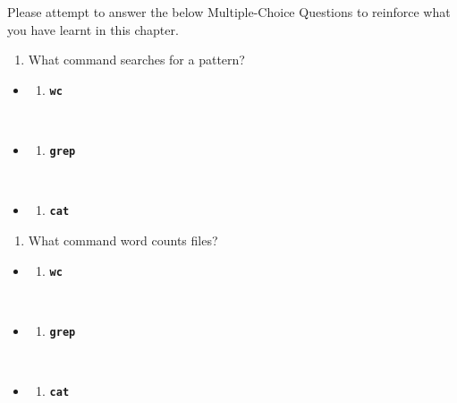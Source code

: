\documentclass[
  letterpaper,
  DIV=11,
  numbers=noendperiod]{scrreprt}
\providecommand{\tightlist}{%
  \setlength{\itemsep}{0pt}\setlength{\parskip}{0pt}}
\begin{document}
Please attempt to answer the below Multiple-Choice Questions to
reinforce what you have learnt in this chapter.

\begin{enumerate}
\def\labelenumi{\arabic{enumi}.}
\tightlist
\item
  What command searches for a pattern?
\end{enumerate}

\begin{itemize}
\tightlist
\item
  \begin{enumerate}
  \def\labelenumi{(\Alph{enumi})}
  \tightlist
  \item
    \textbf{\texttt{wc}}\strut \\
  \end{enumerate}
\item
  \begin{enumerate}
  \def\labelenumi{(\Alph{enumi})}
  \setcounter{enumi}{1}
  \tightlist
  \item
    \textbf{\texttt{grep}}\strut \\
  \end{enumerate}
\item
  \begin{enumerate}
  \def\labelenumi{(\Alph{enumi})}
  \setcounter{enumi}{2}
  \tightlist
  \item
    \textbf{\texttt{cat}}
  \end{enumerate}
\end{itemize}

\begin{enumerate}
\def\labelenumi{\arabic{enumi}.}
\setcounter{enumi}{1}
\tightlist
\item
  What command word counts files?
\end{enumerate}

\begin{itemize}
\tightlist
\item
  \begin{enumerate}
  \def\labelenumi{(\Alph{enumi})}
  \tightlist
  \item
    \textbf{\texttt{wc}}\strut \\
  \end{enumerate}
\item
  \begin{enumerate}
  \def\labelenumi{(\Alph{enumi})}
  \setcounter{enumi}{1}
  \tightlist
  \item
    \textbf{\texttt{grep}}\strut \\
  \end{enumerate}
\item
  \begin{enumerate}
  \def\labelenumi{(\Alph{enumi})}
  \setcounter{enumi}{2}
  \tightlist
  \item
    \textbf{\texttt{cat}}
  \end{enumerate}
\end{itemize}
\end{document}
